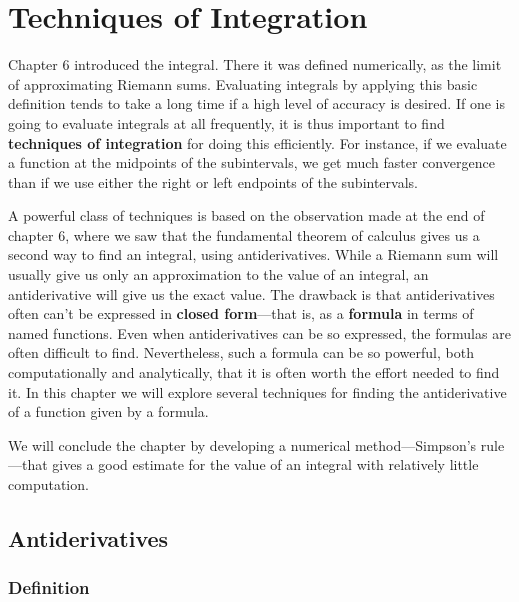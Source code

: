 
\chapter{Techniques of Integration}
\label{chap:techniques-of-integration}

Chapter 6 introduced the integral.  There it was defined numerically,
as the limit of approximating Riemann sums.  Evaluating integrals by
applying this basic definition tends to take a long time if a high
level of accuracy is desired.  If one is going to evaluate integrals
at all frequently, it is thus important to find {\bf techniques of
  integration} for doing this efficiently.  For instance, if we
evaluate a function at the midpoints of the subintervals, we get much
faster convergence than if we use either the right or left endpoints
of the subintervals.

A powerful class of techniques is based on the observation made at the
end of chapter 6, where we saw that the fundamental theorem of
calculus gives us a second way to find an integral, using
antiderivatives. While a Riemann sum will usually give us only an
approximation to the value of an integral, an antiderivative will give
us the exact value.  The drawback is that antiderivatives often can't
be expressed in {\bf closed form}---that is, as a {\bf
  formula} in terms of named functions.  Even when antiderivatives can
be so expressed, the formulas are often difficult to find.
Nevertheless, such a formula can be so powerful, both computationally
and analytically, that it is often worth the effort needed to find it.
In this chapter we will explore several techniques for finding the
antiderivative of a function given by a formula.

We will conclude the chapter by developing a numerical
method---Simpson's rule---that gives a good estimate for the value of
an integral with relatively little computation.



\section{Antiderivatives}
\label{sec:antiderivatives}

\subsection{Definition}
\label{subsec:definition}

